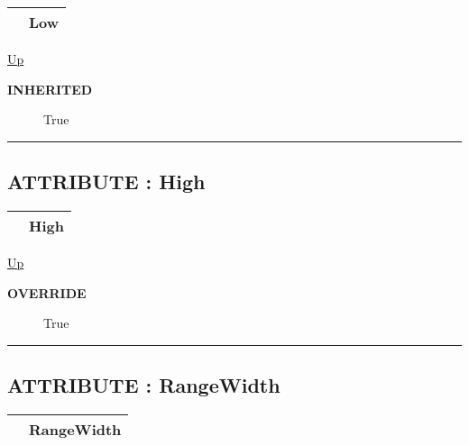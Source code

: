 {\renewcommand{\arraystretch}{1.5}
\begin{tabularx}{\textwidth}{|>{\raggedright\arraybackslash}l|X|}
\hline
\hspace{0pt} & Low \\
\hline
\end{tabularx}
}

\hyperlink{ecldoc:linearregression.ols.fdistribution}{Up}

\par

\par
\begin{description}
\item [\textbf{INHERITED}] True
\end{description}

\rule{\textwidth}{0.4pt}
\subsection*{ATTRIBUTE : High}
\hypertarget{ecldoc:linearregression.ols.fdistribution.high}{}

{\renewcommand{\arraystretch}{1.5}
\begin{tabularx}{\textwidth}{|>{\raggedright\arraybackslash}l|X|}
\hline
\hspace{0pt} & High \\
\hline
\end{tabularx}
}

\hyperlink{ecldoc:linearregression.ols.fdistribution}{Up}

\par

\par
\begin{description}
\item [\textbf{OVERRIDE}] True
\end{description}

\rule{\textwidth}{0.4pt}
\subsection*{ATTRIBUTE : RangeWidth}
\hypertarget{ecldoc:linearregression.ols.fdistribution.rangewidth}{}

{\renewcommand{\arraystretch}{1.5}
\begin{tabularx}{\textwidth}{|>{\raggedright\arraybackslash}l|X|}
\hline
\hspace{0pt} & RangeWidth \\
\hline
\end{tabularx}
}

